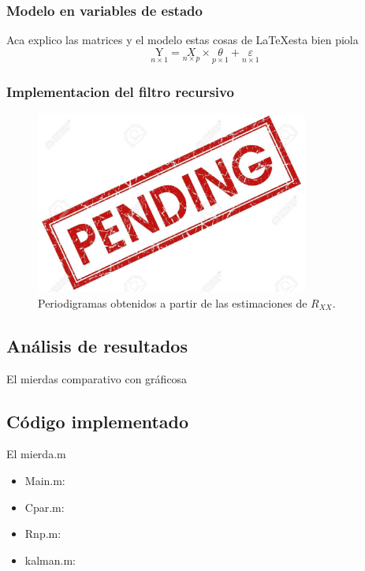 \subsubsection{Modelo en variables de estado}
Aca explico las matrices y el modelo estas cosas de \LaTeX esta bien piola
\begin{equation}
\underset{n\times 1}{\mathrm{Y}} =  \underset{n\times p}{X} \times 
\underset{p\times 1}{\theta} + \underset{n\times 1}{\varepsilon}
\end{equation}

\subsubsection{Implementacion del filtro recursivo}

\begin{figure}[H]
\centering
	\includegraphics[width=0.8\textwidth, trim = {0 0 0 0.735cm},clip]{./Imagenes/pend.jpg}
	\caption{Periodigramas obtenidos a partir de las estimaciones de $R_{XX}$.}
	\label{fig:period-est}
\end{figure}

\subsection{Análisis de resultados}
El mierdas comparativo con gráficosa
\subsection{Código implementado}
El mierda.m
\begin{itemize}
\item Main.m:
	
	
\item Cpar.m:
	
	
\item Rnp.m:
	
	
\item kalman.m:
	

\end{itemize}

